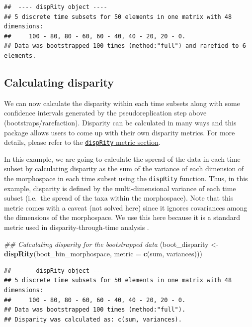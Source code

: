 \documentclass[]{book}
\newenvironment{Shaded}{\begin{snugshade}}{\end{snugshade}}
\newcommand{\CommentTok}[1]{\textcolor[rgb]{0.56,0.35,0.01}{\textit{#1}}}
\newcommand{\DataTypeTok}[1]{\textcolor[rgb]{0.13,0.29,0.53}{#1}}
\newcommand{\KeywordTok}[1]{\textcolor[rgb]{0.13,0.29,0.53}{\textbf{#1}}}
\newcommand{\NormalTok}[1]{#1}
\newcommand{\StringTok}[1]{\textcolor[rgb]{0.31,0.60,0.02}{#1}}
\begin{document}
\begin{verbatim}
##  ---- dispRity object ---- 
## 5 discrete time subsets for 50 elements in one matrix with 48 dimensions:
##     100 - 80, 80 - 60, 60 - 40, 40 - 20, 20 - 0.
## Data was bootstrapped 100 times (method:"full") and rarefied to 6 elements.
\end{verbatim}

\hypertarget{calculating-disparity-1}{%
\subsection{Calculating disparity}\label{calculating-disparity-1}}

We can now calculate the disparity within each time subsets along with some confidence intervals generated by the pseudoreplication step above (bootstraps/rarefaction).
Disparity can be calculated in many ways and this package allows users to come up with their own disparity metrics.
For more details, please refer to the \protect\hyperlink{disparity-metrics}{\texttt{dispRity} metric section}.

In this example, we are going to calculate the spread of the data in each time subset by calculating disparity as the sum of the variance of each dimension of the morphospace in each time subset using the \texttt{dispRity} function.
Thus, in this example, disparity is defined by the multi-dimensional variance of each time subset (i.e.~the spread of the taxa within the morphospace).
Note that this metric comes with a caveat (not solved here) since it ignores covariances among the dimensions of the morphospace.
We use this here because it is a standard metric used in disparity-through-time analysis \citep{Wills1994}.

\begin{Shaded}
\begin{Highlighting}[]
\CommentTok{## Calculating disparity for the bootstrapped data}
\NormalTok{(boot_disparity <-}\StringTok{ }\KeywordTok{dispRity}\NormalTok{(boot_bin_morphospace, }\DataTypeTok{metric =} \KeywordTok{c}\NormalTok{(sum, variances)))}
\end{Highlighting}
\end{Shaded}

\begin{verbatim}
##  ---- dispRity object ---- 
## 5 discrete time subsets for 50 elements in one matrix with 48 dimensions:
##     100 - 80, 80 - 60, 60 - 40, 40 - 20, 20 - 0.
## Data was bootstrapped 100 times (method:"full").
## Disparity was calculated as: c(sum, variances).
\end{verbatim}
\end{document}
